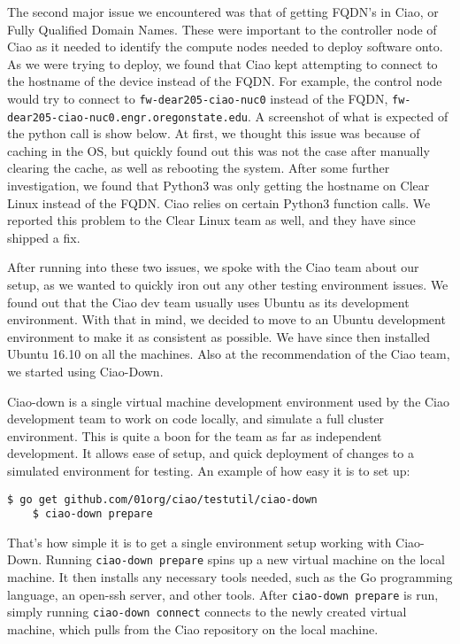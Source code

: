 \documentclass[10pt,onecolumn,journal,draftclsnofoot]{IEEEtran}
\begin{document}
The second major issue we encountered was that of getting FQDN's in Ciao, or
Fully Qualified Domain Names. These were important to the controller node of
Ciao as it needed to identify the compute nodes needed to deploy software onto.
As we were trying to deploy, we found that Ciao kept attempting to connect to
the hostname of the device instead of the FQDN. For example, the control node
would try to connect to \texttt{fw-dear205-ciao-nuc0} instead of the FQDN,
\texttt{fw-dear205-ciao-nuc0.engr.oregonstate.edu}. A screenshot of what is
expected of the python call is show below. At first, we thought this issue was
because of caching in the OS, but quickly found out this was not the case after
manually clearing the cache, as well as rebooting the system.  After some
further investigation, we found that Python3 was only getting the hostname on
Clear Linux instead of the FQDN. Ciao relies on certain Python3 function calls.
We reported this problem to the Clear Linux team as well, and they have since
shipped a fix. 

After running into these two issues, we spoke with the Ciao team about our
setup, as we wanted to quickly iron out any other testing environment issues.
We found out that the Ciao dev team usually uses Ubuntu as its development
environment. With that in mind, we decided to move to an Ubuntu development
environment to make it as consistent as possible. We have since then installed
Ubuntu 16.10 on all the machines. Also at the recommendation of the Ciao team,
we started using Ciao-Down.

Ciao-down is a single virtual machine development
environment used by the Ciao development team to work on code locally, and 
simulate a full cluster environment. This is quite a boon for the team as far
as independent development. It allows ease of setup, and quick deployment of
changes to a simulated environment for testing. An example of how easy it is
to set up:\cite{ciao-down}

\begin{lstlisting}[caption = Simplicity of Ciao-Down setup]
	$ go get github.com/01org/ciao/testutil/ciao-down
	$ ciao-down prepare

\end{lstlisting}

That's how simple it is to get a single environment setup working with 
Ciao-Down. Running \texttt{ciao-down prepare} spins up a new virtual machine
on the local machine. It then installs any necessary tools needed, such as the
Go programming language, an open-ssh server, and other tools. After 
\texttt{ciao-down prepare} is run, simply running
\texttt{ciao-down connect} connects to the newly created virtual machine, which
pulls from the Ciao repository on the local machine.
\end{document}
